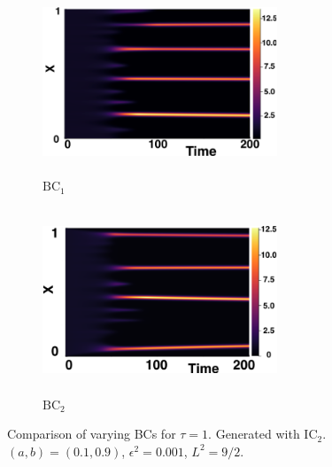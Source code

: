 \begin{figure}[H]
    \centering
    \begin{subfigure}[b]{0.45\textwidth}
        \centering
        \includegraphics[width=7cm,height=5.5cm]{ic21.png}
        \caption{$\text{BC}_1$}
        \label{}
    \end{subfigure}
    \hfill
    \begin{subfigure}[b]{0.45\textwidth}
        \centering
        \includegraphics[width=7cm,height=5.5cm]{bc1.png}
        \caption{$\text{BC}_2$}
        \label{}
    \end{subfigure}
    \caption{Comparison of varying BCs for $\tau=1$. Generated with $\text{IC}_2$. $(a,b)=(0.1,0.9)$, $\epsilon^2=0.001$, $L^2=9/2$.}
    \label{fig:bctau2}
\end{figure}

